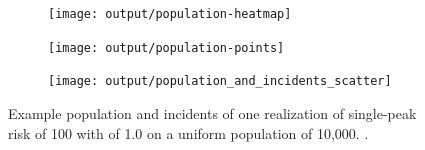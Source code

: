 \begin{figure}[htbp]
    \centering
    \begin{subfigure}[t]{0.32\textwidth}
        \texttt{[image: output/population-heatmap]}
        \label{fig:cases_scatter:unif_100_1.0_1h:popdist}
    \end{subfigure}
    \begin{subfigure}[t]{0.32\textwidth}
        \texttt{[image: output/population-points]}
        \label{fig:cases_scatter:unif_100_1.0_1h:poppts}
    \end{subfigure}%
    \begin{subfigure}[t]{0.32\textwidth}
        \texttt{[image: output/population\_and\_incidents\_scatter]}
        \label{fig:cases_scatter:unif_100_1.0_1h:incidentspts}
    \end{subfigure}%
    \caption[Example population and incidents: single-peak risk on uniform population]
        {Example population and incidents of one realization of single-peak risk of  100 with  of 1.0 on a uniform population of 10,000.
        \scatterplotcaption.}
    \label{fig:cases_scatter:unif_100_1.0_1h}    
\end{figure}

